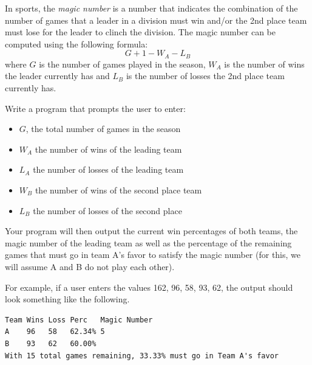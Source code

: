 \begin{exer}
In sports, the \emph{magic number} is a number that indicates the
combination of the number of games that a leader in a division must win and/or
the 2nd place team must lose for the leader to clinch the division.  The
magic number can be computed using the following formula:
  $$G + 1 - W_A - L_B$$
where $G$ is the number of games played in the season, $W_A$ is the number
of wins the leader currently has and $L_B$ is the number of losses the 2nd
place team currently has.

Write a program that prompts the user to enter:
\begin{itemize}
  \item $G$, the total number of games in the season
  \item $W_A$ the number of wins of the leading team
  \item $L_A$ the number of losses of the leading team
  \item $W_B$ the number of wins of the second place team
  \item $L_B$ the number of losses of the second place
\end{itemize}
Your program will then output the current win percentages of both teams,
the magic number of the leading team as well as the percentage of the
remaining games that must go in team A's favor to satisfy the magic
number (for this, we will assume A and B do not play each other).

For example, if a user enters the values 162, 96, 58, 93, 62, the output
should look something like the following.

\begin{verbatim}
Team Wins Loss Perc   Magic Number
A    96   58   62.34% 5 
B    93   62   60.00%
With 15 total games remaining, 33.33% must go in Team A's favor
\end{verbatim}
\end{exer}


